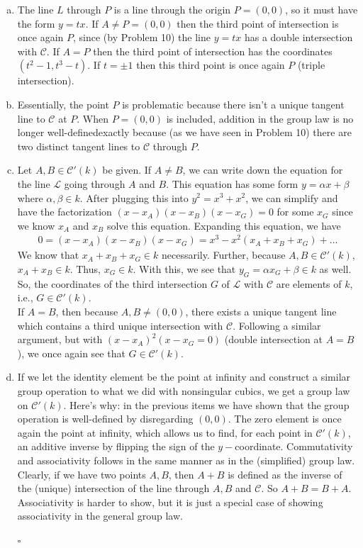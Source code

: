 \documentclass[12pt]{article}
\newcommand{\al}{\alpha}
\newcommand{\be}{\beta}
\begin{document}
\begin{enumerate}[(a)]
	\item The line $L$ through $P$ is a line through the origin $P=(0,0)$, so it must have the form $y = tx$. If $A \neq P = (0,0)$ then the third point of intersection is once again $P$, since (by Problem 10) the line $y = tx$ has a double intersection with $\mathcal{C}$. If $A = P$ then the third point of intersection has the coordinates $(t^2-1, t^3-t)$. If $t = \pm 1$ then this third point is once again $P$ (triple intersection). 
	\item Essentially, the point $P$ is problematic because there isn't a unique tangent line to $\mathcal{C}$ at $P$. When $P = (0,0)$ is included, addition in the group law is no longer well-defined\textemdash exactly because (as we have seen in Problem 10) there are two distinct tangent lines to $\mathcal{C}$ through $P$.  
	\item  Let $A,B\in \mathcal{C}'(k)$ be given. If $A\neq B$, we can write down the equation for the line $\mathcal{L}$ going through $A$ and $B$. This equation has some form $y = \al x + \be$ where $\al,\be \in k$. After plugging this into $y^2 = x^3 + x^2$, we can simplify and have the factorization $(x-x_A)(x-x_B)(x-x_G) = 0$ for some $x_G$ since we know $x_A$ and $x_B$ solve this equation. Expanding this equation, we have
	\begin{align}
	0 = (x-x_A)(x-x_B)(x-x_G) = x^3 - x^2(x_A+x_B+x_G) + \dots
	\end{align}
	We know that $x_A+x_B+x_G \in k$ necessarily. Further, because $A,B \in \mathcal{C}'(k)$, $x_A + x_B \in k$. Thus, $x_G \in k$. With this, we see that $y_G = \al x_G + \be \in k$ as well. So, the coordinates of the third intersection $G$ of $\mathcal{L}$ with $\mathcal{C}$ are elements of $k$, i.e., $G \in \mathcal{C}'(k)$.  \\
	
	If $A = B$, then because $A,B \neq (0,0)$, there exists a unique tangent line which contains a third unique intersection with $\mathcal{C}$. Following a similar argument, but with $(x-x_A)^2(x-x_G = 0)$ (double intersection at $A=B$), we once again see that $G \in \mathcal{C}'(k)$. 
	
	
	\item If we let the identity element be the point at infinity and construct a similar group operation to what we did with nonsingular cubics, we get a group law on $\mathcal{C}'(k)$. Here's why: in the previous items we have shown that the group operation is well-defined by disregarding $(0,0)$. The zero element is once again the point at infinity, which allows us to find, for each point in $\mathcal{C}'(k)$, an additive inverse by flipping the sign of the $y-$coordinate. Commutativity and associativity follows in the same manner as in the (simplified) group law. Clearly, if we have two points $A,B$, then $A+B$ is defined as the inverse of the (unique) intersection of the line through $A,B$ and $\mathcal{C}$. So $A+B = B+A$. Associativity is harder to show, but it is just a special case of showing associativity in the general group law.
	
	\hfill $\square$
	
	
\end{enumerate}







	
\end{document}
